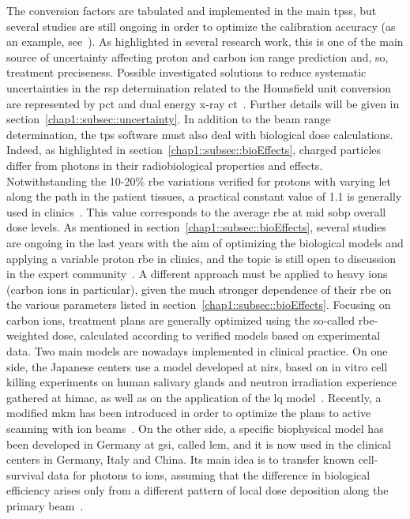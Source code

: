 The conversion factors are tabulated and implemented in the main \glspl{tps}, but several studies are still ongoing in order to optimize the calibration accuracy (as an example, see~\cite{Inaniwa2018}). As highlighted in several research work, this is one of the main source of uncertainty affecting proton and carbon ion range prediction and, so, treatment preciseness. Possible investigated solutions to reduce systematic uncertainties in the \gls{rsp} determination related to the Hounsfield unit conversion are represented by \gls{pct} and dual energy x-ray \gls{ct}~\parencite{Yang2010}. Further details will be given in section~\ref{chap1::subsec::uncertainty}.
In addition to the beam range determination,  the \gls{tps} software must also deal with biological dose calculations. Indeed, as highlighted in section~\ref{chap1::subsec::bioEffects}, charged particles differ from photons in their radiobiological properties and effects. Notwithstanding the 10-20\% \gls{rbe} variations verified for protons with varying \gls{let} along the path in the patient tissues, a practical constant value of 1.1 is generally used in clinics~\parencite{Paganetti2002, ICRU2007}. This value corresponds to the average \gls{rbe} at mid \gls{sobp} overall dose levels. As mentioned in section~\ref{chap1::subsec::bioEffects}, several studies are ongoing in the last years with the aim of optimizing the biological models and applying a variable proton \gls{rbe} in clinics, and the topic is still open to discussion in the expert community~\parencite{Paganetti2013, Paganetti2014, Unkelbach2018, Luhr2018, Willers2018}. A different approach must be applied to heavy ions (carbon ions in particular), given the much stronger dependence of their \gls{rbe} on the various parameters listed in section~\ref{chap1::subsec::bioEffects}. Focusing on carbon ions, treatment plans are generally optimized using the so-called \gls{rbe}-weighted dose, calculated according to verified models based on experimental data. Two main models are nowadays implemented in clinical practice. On one side, the Japanese centers use a model developed at \gls{nirs}, based on in vitro cell killing experiments on human salivary glands and neutron irradiation experience gathered at \gls{himac}, as well as on the application of the \gls{lq} model~\parencite{Matsufuji2007}. Recently, a modified \gls{mkm} has been introduced in order to optimize the plans to active scanning with ion beams~\parencite{Inaniwa2015}. On the other side, a specific biophysical model has been developed in Germany at \gls{gsi}, called \gls{lem}, and it is now used in the clinical centers in Germany, Italy and China. Its main idea is to transfer known cell-survival data for photons to ions, assuming that the difference in biological efficiency arises only from a different pattern of local dose deposition along the primary beam~\parencite{Kramer2000, Jakel2001a}.
